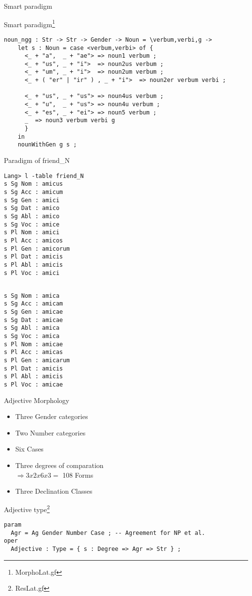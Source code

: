 \documentclass{beamer}
\begin{document}
\begin{frame}[fragile]{Smart paradigm}
\begin{example}{Smart paradigm\footnote{MorphoLat.gf}}
\begin{Verbatim}[label=Smart paradigm,fontsize=\scriptsize]
  noun_ngg : Str -> Str -> Gender -> Noun = \verbum,verbi,g -> 
    let s : Noun = case <verbum,verbi> of {
      <_ + "a",  _ + "ae"> => noun1 verbum ;
      <_ + "us", _ + "i">  => noun2us verbum ;
      <_ + "um", _ + "i">  => noun2um verbum ;
      <_ + ( "er" | "ir" ) , _ + "i">  => noun2er verbum verbi ;

      <_ + "us", _ + "us"> => noun4us verbum ;
      <_ + "u",  _ + "us"> => noun4u verbum ;
      <_ + "es", _ + "ei"> => noun5 verbum ;
      _  => noun3 verbum verbi g
      }
    in  
    nounWithGen g s ;
\end{Verbatim}
\end{example}
\end{frame}
\begin{frame}[fragile]
\begin{example}{Paradigm of friend\_N}
\begin{multicols}{2}
\begin{Verbatim}
Lang> l -table friend_N
s Sg Nom : amicus
s Sg Acc : amicum
s Sg Gen : amici
s Sg Dat : amico
s Sg Abl : amico
s Sg Voc : amice
s Pl Nom : amici
s Pl Acc : amicos
s Pl Gen : amicorum
s Pl Dat : amicis
s Pl Abl : amicis
s Pl Voc : amici
\end{Verbatim}
\begin{Verbatim}

s Sg Nom : amica
s Sg Acc : amicam
s Sg Gen : amicae
s Sg Dat : amicae
s Sg Abl : amica
s Sg Voc : amica
s Pl Nom : amicae
s Pl Acc : amicas
s Pl Gen : amicarum
s Pl Dat : amicis
s Pl Abl : amicis
s Pl Voc : amicae
\end{Verbatim}
\end{multicols}
\end{example}
\end{frame}
\begin{frame}[fragile]{Adjective Morphology}
\begin{itemize}
  \item Three Gender categories
  \item Two Number categories
  \item Six Cases
  \item Three degrees of comparation \\
  $\Rightarrow 3 x 2 x 6 x 3 = $ 108 Forms 
  \item Three Declination Classes
\end{itemize}
\begin{example}{Adjective type\footnote{ResLat.gf}}
\begin{Verbatim}
param
  Agr = Ag Gender Number Case ; -- Agreement for NP et al.
oper
  Adjective : Type = { s : Degree => Agr => Str } ;
\end{Verbatim}
\end{example}
\end{frame}
\end{document}
